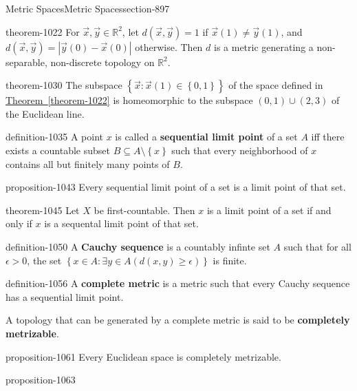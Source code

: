 \documentclass[oneside,10pt,]{article}
\newcommand{\terminology}[1]{\textbf{#1}}
\newcommand{\mb}{\mathbb}
\newcommand{\setBuilder}[2]{\left\{#1:#2\right\}}
\newcommand{\setList}[1]{\left\{#1\right\}}
\newcommand{\gt}{>}
\begin{document}
\begin{sectionptx}{Metric Spaces}{}{Metric Spaces}{}{}{section-897}
\begin{theorem}{}{}{theorem-1022}
\hypertarget{p-1023}{}%
For \(\vec x,\vec y\in\mb R^2\), let \(d(\vec x,\vec y)=1\) if \(\vec x(1)\not=\vec y(1)\), and \(d(\vec x,\vec y)=|\vec y(0)-\vec x(0)|\) otherwise. Then \(d\) is a metric generating a non-separable, non-discrete topology on \(\mb R^2\).%
\end{theorem}
\begin{theorem}{}{}{theorem-1030}%
\hypertarget{p-1031}{}%
The subspace \(\setBuilder{\vec x}{\vec{x}(1)\in\setList{0,1}}\) of the space defined in \hyperref[theorem-1022]{Theorem~\ref{theorem-1022}} is homeomorphic to the subspace \((0,1)\cup(2,3)\) of the Euclidean line.%
\end{theorem}
\begin{definition}{}{definition-1035}%
\hypertarget{p-1036}{}%
A point \(x\) is called a \terminology{sequential limit point} of a set \(A\) iff there exists a countable subset \(B\subseteq A\setminus\setList{x}\) such that every neighborhood of \(x\) contains all but finitely many points of \(B\).%
\end{definition}
\begin{proposition}{}{}{proposition-1043}%
\hypertarget{p-1044}{}%
Every sequential limit point of a set is a limit point of that set.%
\end{proposition}
\begin{theorem}{}{}{theorem-1045}%
\hypertarget{p-1046}{}%
Let \(X\) be first-countable. Then \(x\) is a limit point of a set if and only if \(x\) is a sequental limit point of that set.%
\end{theorem}
\begin{definition}{}{definition-1050}%
\hypertarget{p-1051}{}%
A \terminology{Cauchy sequence} is a countably infinte set \(A\) such that for all \(\epsilon\gt0\), the set \(\setBuilder{x\in A}{\exists y\in A(d(x,y)\geq\epsilon)}\) is finite.%
\end{definition}
\begin{definition}{}{definition-1056}%
\hypertarget{p-1057}{}%
A \terminology{complete metric} is a metric such that every Cauchy sequence has a sequential limit point.%
\par
\hypertarget{p-1059}{}%
A topology that can be generated by a complete metric is said to be \terminology{completely metrizable}.%
\end{definition}
\begin{proposition}{}{}{proposition-1061}%
\hypertarget{p-1062}{}%
Every Euclidean space is completely metrizable.%
\end{proposition}
\begin{proposition}{}{}{proposition-1063}%

\end{proposition}
\end{sectionptx}
\end{document}
